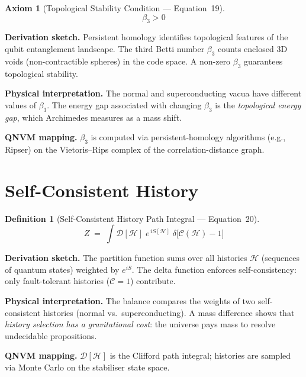 \documentclass[11pt,a4paper]{article}
\newtheorem{axiom}{Axiom}
\newtheorem{definition}{Definition}[section]
\theoremstyle{remark}
\newcommand{\DHH}{\mathcal{D}[\mathcal{H}]}
\newcommand{\CalC}{\mathcal{C}}
\begin{document}
\begin{axiom}[Topological Stability Condition --- Equation~19]
\begin{equation}\label{eq:betti}
    \beta_3 > 0
\end{equation}
\end{axiom}

\textbf{Derivation sketch.}\quad
Persistent homology identifies topological features of the qubit entanglement landscape.  The third Betti number $\beta_3$ counts enclosed 3D voids (non-contractible spheres) in the code space.  A non-zero $\beta_3$ guarantees topological stability.

\textbf{Physical interpretation.}\quad
The normal and superconducting vacua have different values of $\beta_3$.  The energy gap associated with changing $\beta_3$ is the \emph{topological energy gap}, which Archimedes measures as a mass shift.

\textbf{QNVM mapping.}\quad
$\beta_3$ is computed via persistent-homology algorithms (e.g., Ripser) on the Vietoris--Rips complex of the correlation-distance graph.

\section{Self-Consistent History}
\label{sec:eq20}

\begin{definition}[Self-Consistent History Path Integral --- Equation~20]
\begin{equation}\label{eq:history}
    Z \;=\; \int \DHH\; e^{\,iS[\mathcal{H}]}\; \delta\!\bigl[\CalC(\mathcal{H}) - 1\bigr]
\end{equation}
\end{definition}

\textbf{Derivation sketch.}\quad
The partition function sums over all histories $\mathcal{H}$ (sequences of quantum states) weighted by $e^{iS}$.  The delta function enforces self-consistency: only fault-tolerant histories ($\CalC = 1$) contribute.

\textbf{Physical interpretation.}\quad
The balance compares the weights of two self-consistent histories (normal vs.\ superconducting).  A mass difference shows that \emph{history selection has a gravitational cost}: the universe pays mass to resolve undecidable propositions.

\textbf{QNVM mapping.}\quad
$\DHH$ is the Clifford path integral; histories are sampled via Monte Carlo on the stabiliser state space.
\end{document}

